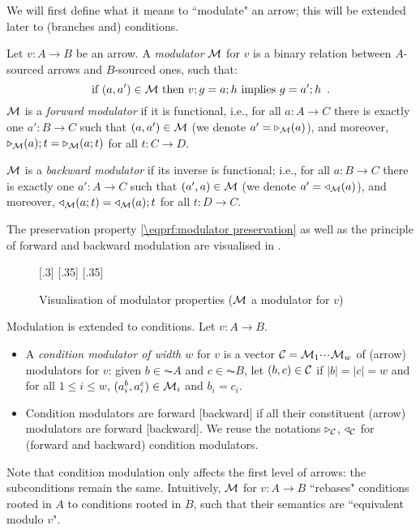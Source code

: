 We will first define what it means to ``modulate" an arrow; this will be extended later to (branches and) conditions.
%
\begin{definition}[modulator]
Let $v:A\to B$ be an arrow. A \emph{modulator} $\mathcal{M}$ for $v$ is a binary relation between $A$-sourced arrows and $B$-sourced ones, such that:
%
\begin{equation}\eqlabel{modulator preservation}
\text{if } (a,a')\in \cM \text{ then } v;g=a;h \text{ implies } g=a';h \enspace.
\end{equation}
%
$\mathcal{M}$ is a \emph{forward modulator} if it is functional, i.e., for all $a:A\to C$ there is exactly one $a':B\to C$ such that $(a,a')\in \mathcal{M}$ (we denote $a'=\triangleright_{\mathcal{M}}(a)$), and moreover, $\triangleright_{\mathcal{M}}(a);t=\triangleright_{\mathcal{M}}(a;t)$ for all $t:C\to D$.

$\mathcal{M}$ is a \emph{backward modulator} if its inverse is functional; i.e., for all $a:B\to C$ there is exactly one $a':A\to C$ such that $(a',a)\in \mathcal{M}$ (we denote $a'=\triangleleft_{\mathcal{M}}(a)$), and moreover, $\triangleleft_{\mathcal{M}}(a;t)=\triangleleft_{\mathcal{M}}(a);t$ for all $t:D\to C$.
\end{definition}
%
The preservation property \eqref{\eqprf:modulator preservation} as well as the principle of forward and backward modulation are visualised in .
%
\begin{figure}
\centering
{}[.3\textwidth]
              {}%
[.35\textwidth]{}%
[.35\textwidth]{}%
\caption{Visualisation of modulator properties ($\mathcal{M}$ a modulator for $v$)}
\end{figure}

Modulation is extended to conditions. Let $v:A\to B$.
%
\begin{itemize}
\item A \emph{condition modulator of width $w$} for $v$ is a vector $\mathcal{C}=\mathcal{M}_1{\cdotp\mkern-2mu\cdotp\mkern-2mu\cdotp\mkern1mu} \mathcal{M}_w$ of (arrow) modulators for $v$: given $b\in \AC A$ and $c\in \AC B$, let $(b,c)\in \mathcal{C}$ if $|b|=|c|=w$ and for all $1\leq i\leq w$, $(a^b_i,a^c_i)\in \mathcal{M}_i$ and $b_i=c_i$.
\item Condition modulators are forward [backward] if all their constituent (arrow) modulators are forward [backward]. We reuse the notations $\triangleright_{\mathcal{C}}$, $\triangleleft_{\mathcal{C}}$ for (forward and backward) condition modulators.
\end{itemize}
%
Note that condition modulation only affects the first level of arrows: the subconditions remain the same. Intuitively, $\mathcal{M}$ for $v:A\to B$ ``rebases" conditions rooted in $A$ to conditions rooted in $B$, such that their semantics are ``equivalent modulo $v$". 

